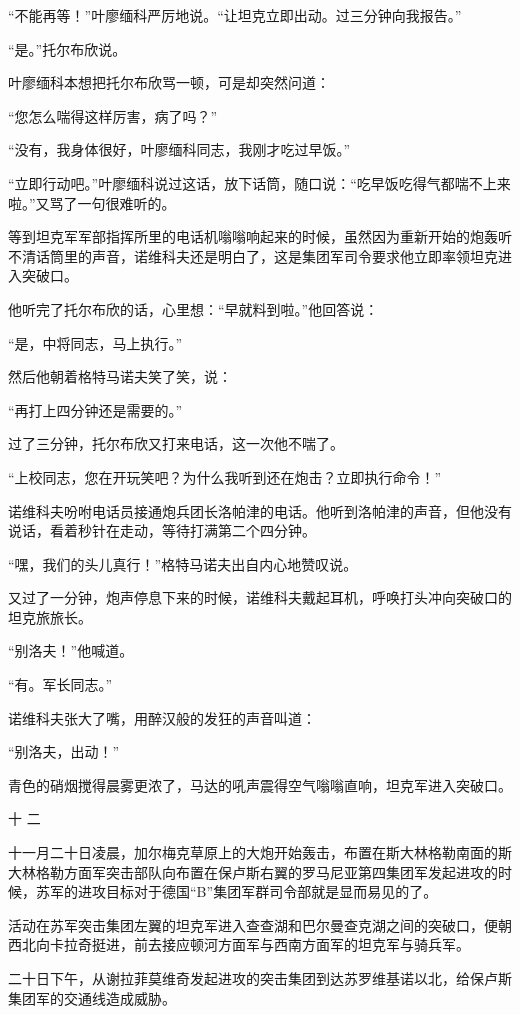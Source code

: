 “不能再等！”叶廖缅科严厉地说。“让坦克立即出动。过三分钟向我报告。”

“是。”托尔布欣说。

叶廖缅科本想把托尔布欣骂一顿，可是却突然问道：

“您怎么喘得这样厉害，病了吗？”

“没有，我身体很好，叶廖缅科同志，我刚才吃过早饭。”

“立即行动吧。”叶廖缅科说过这话，放下话筒，随口说：“吃早饭吃得气都喘不上来啦。”又骂了一句很难听的。

等到坦克军军部指挥所里的电话机嗡嗡响起来的时候，虽然因为重新开始的炮轰听不清话筒里的声音，诺维科夫还是明白了，这是集团军司令要求他立即率领坦克进入突破口。

他听完了托尔布欣的话，心里想：“早就料到啦。”他回答说：

“是，中将同志，马上执行。”

然后他朝着格特马诺夫笑了笑，说：

“再打上四分钟还是需要的。”

过了三分钟，托尔布欣又打来电话，这一次他不喘了。

“上校同志，您在开玩笑吧？为什么我听到还在炮击？立即执行命令！”

诺维科夫吩咐电话员接通炮兵团长洛帕津的电话。他听到洛帕津的声音，但他没有说话，看着秒针在走动，等待打满第二个四分钟。

“嘿，我们的头儿真行！”格特马诺夫出自内心地赞叹说。

又过了一分钟，炮声停息下来的时候，诺维科夫戴起耳机，呼唤打头冲向突破口的坦克旅旅长。

“别洛夫！”他喊道。

“有。军长同志。”

诺维科夫张大了嘴，用醉汉般的发狂的声音叫道：

“别洛夫，出动！”

青色的硝烟搅得晨雾更浓了，马达的吼声震得空气嗡嗡直响，坦克军进入突破口。

十 二

十一月二十日凌晨，加尔梅克草原上的大炮开始轰击，布置在斯大林格勒南面的斯大林格勒方面军突击部队向布置在保卢斯右翼的罗马尼亚第四集团军发起进攻的时候，苏军的进攻目标对于德国“B”集团军群司令部就是显而易见的了。

活动在苏军突击集团左翼的坦克军进入查查湖和巴尔曼查克湖之间的突破口，便朝西北向卡拉奇挺进，前去接应顿河方面军与西南方面军的坦克军与骑兵军。

二十日下午，从谢拉菲莫维奇发起进攻的突击集团到达苏罗维基诺以北，给保卢斯集团军的交通线造成威胁。

